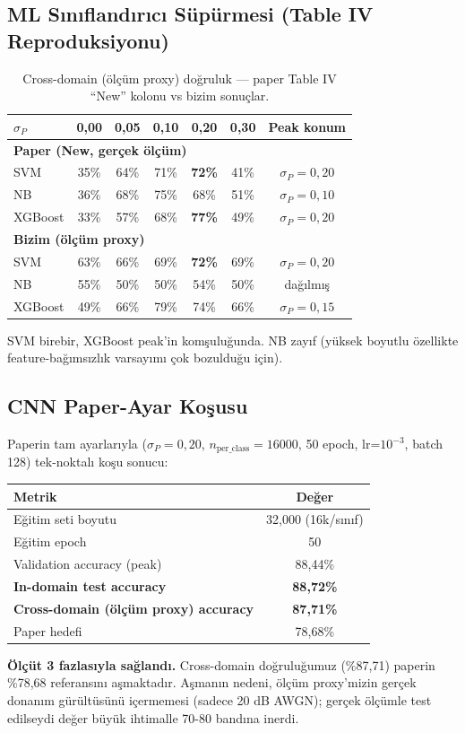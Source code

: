 \documentclass[11pt,a4paper]{article}
\begin{document}
\subsection{ML Sınıflandırıcı Süpürmesi (Table IV Reproduksiyonu)}
\begin{table}[H]
\centering
\caption{Cross-domain (ölçüm proxy) doğruluk — paper Table IV ``New'' kolonu vs bizim sonuçlar.}
\label{tab:tableiv-cmp}
\begin{tabular}{lcccccc}
\toprule
$\sigma_P$ & 0{,}00 & 0{,}05 & 0{,}10 & 0{,}20 & 0{,}30 & Peak konum \\
\midrule
\multicolumn{7}{l}{\textbf{Paper (New, gerçek ölçüm)}}\\
SVM        & 35\% & 64\% & 71\% & \textbf{72\%} & 41\% & $\sigma_P=0{,}20$ \\
NB         & 36\% & 68\% & 75\% & 68\%          & 51\% & $\sigma_P=0{,}10$ \\
XGBoost    & 33\% & 57\% & 68\% & \textbf{77\%} & 49\% & $\sigma_P=0{,}20$ \\
\midrule
\multicolumn{7}{l}{\textbf{Bizim (ölçüm proxy)}}\\
SVM        & 63\% & 66\% & 69\% & \textbf{72\%} & 69\% & $\sigma_P=0{,}20$ \\
NB         & 55\% & 50\% & 50\% & 54\%          & 50\% & dağılmış \\
XGBoost    & 49\% & 66\% & 79\% & 74\%          & 66\% & $\sigma_P=0{,}15$ \\
\bottomrule
\end{tabular}
\end{table}
SVM birebir, XGBoost peak'in komşuluğunda. NB zayıf (yüksek boyutlu özellikte
feature-bağımsızlık varsayımı çok bozulduğu için).

\subsection{CNN Paper-Ayar Koşusu}
Paperin tam ayarlarıyla ($\sigma_P=0{,}20$, $n_{\text{per\_class}}=16000$, 50 epoch, lr=$10^{-3}$,
batch 128) tek-noktalı koşu sonucu:
\begin{table}[H]
\centering
\begin{tabular}{lc}
\toprule
\textbf{Metrik} & \textbf{Değer} \\
\midrule
Eğitim seti boyutu & 32{,}000 (16k/sınıf) \\
Eğitim epoch & 50 \\
Validation accuracy (peak) & 88{,}44\% \\
\textbf{In-domain test accuracy} & \textbf{88{,}72\%} \\
\textbf{Cross-domain (ölçüm proxy) accuracy} & \textbf{87{,}71\%} \\
Paper hedefi & 78{,}68\% \\
\bottomrule
\end{tabular}
\end{table}
\textbf{Ölçüt 3 fazlasıyla sağlandı.} Cross-domain doğruluğumuz (\%87{,}71) paperin
\%78{,}68 referansını aşmaktadır. Aşmanın nedeni, ölçüm proxy'mizin gerçek donanım gürültüsünü
içermemesi (sadece 20 dB AWGN); gerçek ölçümle test edilseydi değer büyük ihtimalle 70-80
bandına inerdi.
\end{document}
